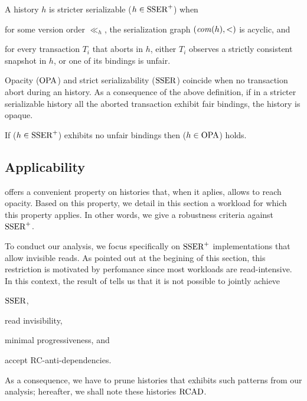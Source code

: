 \begin{definition}
  A history $h$ is stricter serializable ($h \in \SPSER$) when
  \begin{inparaenum}
  \item for some version order $\ll_h$, the serialization graph $(\committed{h},<)$ is acyclic, and
  \item for every transaction $T_i$ that aborts in $h$, either $T_i$ observes a strictly consistent snapshot in $h$, or one of its bindings is unfair.
  \end{inparaenum}
\end{definition}

Opacity ($\OPA$) and strict serializability ($\SSER$) coincide when no transaction abort during an history.
As a consequence of the above definition, if in a stricter serializable history all the aborted transaction exhibit fair bindings, the history is opaque.

\begin{corollary}
  If ($h \in \SPSER$) exhibits no unfair bindings then ($h \in \OPA$) holds.
\end{corollary}

\subsection{Applicability}

 offers a convenient property on histories that, when it aplies, allows to reach opacity.
Based on this property, we detail in this section a workload for which this property applies.
In other words, we give a robustness criteria \cite{alexey} against $\SPSER$.

To conduct our analysis, we focus specifically on $\SPSER$ implementations that allow invisible reads.
As pointed out at the begining of this section, this restriction is motivated by perfomance since most workloads are read-intensive.
In this context, the result of \citet{hans16} tells us that it is not possible to jointly achieve
\begin{inparaenum}
\item $\SSER$,
\item read invisibility,
\item minimal progressiveness, and
\item accept RC-anti-dependencies.
\end{inparaenum}
As a consequence, we have to prune histories that exhibits such patterns from our analysis;
hereafter, we shall note these histories $\RCAD$.

